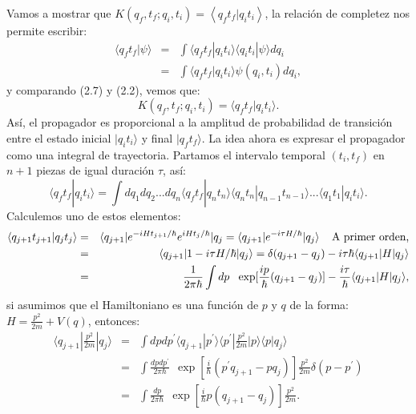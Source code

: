 Vamos a mostrar que $K(q_f,t_f;q_i,t_i)=\left\langle q_ft_f|q_it_i \right\rangle$, la relación de completez nos permite escribir:
\begin{eqnarray}
\nonumber \langle q_ft_f|\psi\rangle &=& \int\langle q_ft_f|q_it_i\rangle\langle q_it_i|\psi\rangle dq_i\\
&=& \int \langle q_ft_f|q_it_i\rangle \psi(q_i,t_i)dq_i ,
\end{eqnarray}
y comparando (2.7) y (2.2), vemos que:
\begin{equation}
K(q_f,t_f;q_i,t_i)=\langle q_ft_f|q_it_i\rangle .
\end{equation}
Así, el propagador es proporcional a la amplitud de probabilidad de transición entre el estado inicial $|q_it_i\rangle$ y final $|q_ft_f\rangle$. La idea ahora es expresar el propagador como una integral de trayectoria. Partamos el intervalo temporal $(t_i,t_f)$ en $n+1$ piezas de igual duración $\tau$, así:
\begin{equation}
\langle q_ft_f|q_it_i\rangle = \int dq_1dq_2...dq_n\langle q_ft_f|q_nt_n\rangle \langle q_nt_n|q_{n-1}t_{n-1}\rangle...\langle q_1t_1|q_it_i\rangle .
\end{equation}
Calculemos uno de estos elementos:
\begin{eqnarray}
\nonumber \langle q_{j+1}t_{j+1}|q_jt_j\rangle &=&\langle q_{j+1}|e^{-iHt_{j+1}/\hbar}e^{iHt_j/\hbar}|q_j=\langle q_{j+1}|e^{-i\tau H/\hbar}|q_j\rangle \hspace{0.4cm}\text{A primer orden,}\\
\nonumber &=&\langle q_{j+1}|1-i\tau H/\hbar|q_j\rangle=\delta(q_{j+1}-q_j)-i\tau\hbar\langle q_{j+1}|H|q_j\rangle\\
&=& \frac{1}{2\pi\hbar}\int dp\ \ \exp[\frac{ip}{\hbar}(q_{j+1}-q_j)]-\frac{i\tau}{\hbar}\langle q_{j+1}|H|q_j\rangle , 
\end{eqnarray}	
si asumimos que el Hamiltoniano es una función de $p$ y $q$ de la forma: $H=\frac{p^2}{2m}+V(q)$, entonces:
\begin{eqnarray}
\nonumber \langle q_{j+1}|\frac{p^2}{2m}|q_j \rangle &=& \int dpdp^{\prime} \langle q_{j+1}|p^{\prime}\rangle\langle p^{\prime}|\frac{p^2}{2m}|p\rangle \langle p|q_j \rangle\\
\nonumber &=&\int \frac{dpdp^{\prime}}{2\pi\hbar}\ \ \exp[\frac{i}{\hbar}(p^{\prime} q_{j+1}-pq_j)]\frac{p^2}{2m}\delta(p-p^{\prime})\\
&=& \int \frac{dp}{2\pi\hbar}\ \ \exp[\frac{i}{\hbar}p(q_{j+1}-q_j)]\frac{p^2}{2m} .
\end{eqnarray}
